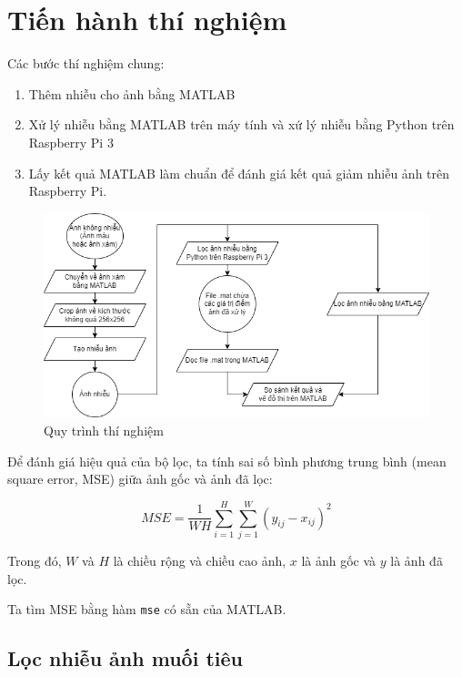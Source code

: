 \section{Tiến hành thí nghiệm}

Các bước thí nghiệm chung:

\begin{enumerate}
    \item Thêm nhiễu cho ảnh bằng MATLAB
    \item Xử lý nhiễu bằng MATLAB trên máy tính và xứ lý nhiễu bằng Python trên Raspberry Pi 3
    \item Lấy kết quả MATLAB làm chuẩn để đánh giá kết quả giảm nhiễu ảnh trên Raspberry Pi.
\end{enumerate}

\begin{figure}[H]
    \centering
    \includegraphics[width=\linewidth]{../images/denoise_flowchart.png}
    \caption{Quy trình thí nghiệm}
\end{figure}

Để đánh giá hiệu quả của bộ lọc, ta tính sai số bình phương trung bình (mean square error, MSE) giữa ảnh gốc và ảnh đã lọc:

\begin{equation}\label{eqn:MSE}
    MSE = \frac{1}{WH} \sum_{i=1}^{H} \sum_{j=1}^{W} {(y_{ij} - x_{ij})^2}
\end{equation}

Trong đó, $W$ và $H$ là chiều rộng và chiều cao ảnh, $x$ là ảnh gốc và $y$ là ảnh đã lọc.

Ta tìm MSE bằng hàm \verb|mse| có sẵn của MATLAB.

\subsection{Lọc nhiễu ảnh muối tiêu}

